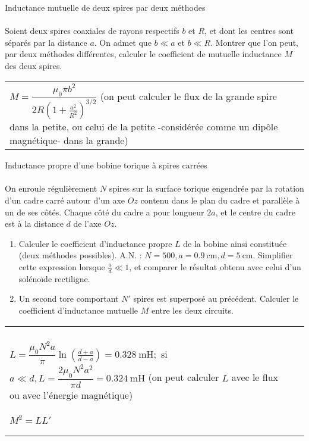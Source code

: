 \documentclass[french, a4paper, 11pt]{article}
\begin{document}
\begin{cadre}{Inductance mutuelle de deux spires par deux méthodes}
  \paragraph*{}
  Soient deux spires coaxiales de rayons respectifs \(b\) et \(R\), et dont les centres sont séparés par la distance \(a\).
  On admet que \(b \ll a\) et \(b \ll R\). Montrer que l'on peut, par deux méthodes différentes, calculer le coefficient
  de mutuelle inductance \(M\) des deux spires.

  \tcblower
  \begin{tabularx}{\linewidth}{Xr}
  \(M=\dfrac{\mu_0\pi b^2}{2R\left(1+\frac{a^2}{R^2}\right)^{3/2}}\) (on peut calculer le flux de la grande spire dans la
  petite, ou celui de la petite -considérée comme un dipôle magnétique- dans la grande)
  \end{tabularx}
\end{cadre}

\begin{cadre}{Inductance propre d'une bobine torique à spires carrées}
  \paragraph*{}
  On enroule régulièrement \(N\) spires sur la surface torique engendrée par la rotation d'un cadre
  carré autour d'un axe \(Oz\) contenu dans le plan du cadre et parallèle à un de ses côtés.
  Chaque côté du cadre a pour longueur \(2a\), et le centre du cadre est à la distance \(d\) de l'axe \(Oz\).
  \begin{enumerate}[label=\upshape\alph*)]
    \item Calculer le coefficient d'inductance propre \(L\) de la bobine ainsi constituée
  (deux méthodes possibles). A.N. : \(N=500, a=\SI{0.9}{\centi\metre}, d=\SI{5}{\centi\metre}\).
  Simplifier cette expression lorsque \(\frac{a}{d} \ll 1\), et comparer le résultat obtenu avec celui d'un solénoïde rectiligne.
    \item Un second tore comportant \(N'\) spires est superposé au précédent. Calculer le coefficient d'inductance mutuelle \(M\)
  entre les deux circuits.
  \end{enumerate}

  \tcblower
  \begin{tabularx}{\linewidth}{Xr}
    \paragraph*{}
    \(L=\dfrac{\mu_0N^2a}{\pi}\ln\left(\frac{d+a}{d-a}\right)=\SI{0.328}{\milli\henry};\)
    si \(a \ll d, L=\dfrac{2\mu_0N^2a^2}{\pi d}=\SI{0.324}{\milli\henry}\)
    (on peut calculer \(L\) avec le flux ou avec l'énergie magnétique)
    \paragraph*{}
    \(M^2=LL'\)
  \end{tabularx}
\end{cadre}
\end{document}
